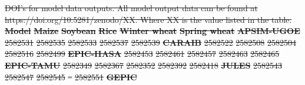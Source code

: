 \documentclass[gmd, manuscript]{copernicus} %
\providecommand{\DIFdel}[1]{{\protect\color{red}\sout{#1}}}                      %
\providecommand{\DIFdelFL}[1]{\DIFdel{#1}} %
\begin{document}
{%
\DIFdelFL{DOI's for model data outputs. All model output data can be found at https://doi.org/10.5281/zenodo/XX. Where XX is the value listed in the table.}} 
\textbf{\DIFdelFL{Model}}%
\textbf{\DIFdelFL{Maize}}%
\textbf{\DIFdelFL{Soybean}}%
\textbf{\DIFdelFL{Rice}}%
\textbf{\DIFdelFL{Winter wheat}}%
\textbf{\DIFdelFL{Spring wheat}}%
\textbf{\DIFdelFL{APSIM-UGOE}}%
\DIFdelFL{2582531}%
\DIFdelFL{2582535}%
\DIFdelFL{2582533}%
\DIFdelFL{2582537}%
\DIFdelFL{2582539}%
\textbf{\DIFdelFL{CARAIB}}%
\DIFdelFL{2582522}%
\DIFdelFL{2582508}%
\DIFdelFL{2582504}%
\DIFdelFL{2582516}%
\DIFdelFL{2582499}%
\textbf{\DIFdelFL{EPIC-IIASA}}%
\DIFdelFL{2582453}%
\DIFdelFL{2582461}%
\DIFdelFL{2582457}%
\DIFdelFL{2582463}%
\DIFdelFL{2582465}%
\textbf{\DIFdelFL{EPIC-TAMU}}%
\DIFdelFL{2582349}%
\DIFdelFL{2582367}%
\DIFdelFL{2582352}%
\DIFdelFL{2582392}%
\DIFdelFL{2582418}%
\textbf{\DIFdelFL{JULES}}%
\DIFdelFL{2582543}%
\DIFdelFL{2582547}%
\DIFdelFL{2582545}%
\DIFdelFL{--}%
\DIFdelFL{2582551}%
\textbf{\DIFdelFL{GEPIC}}%
\end{document}
